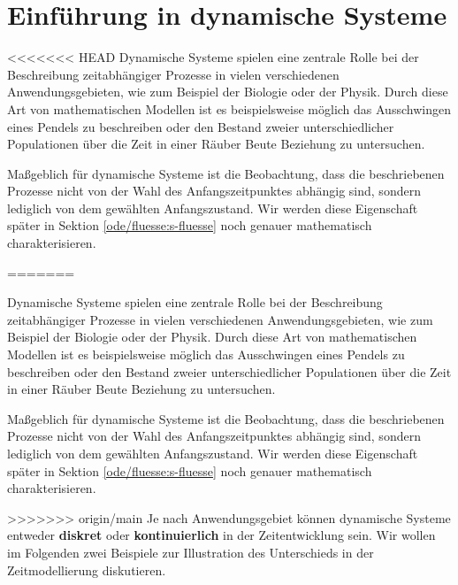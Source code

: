 \documentclass[letterpaper,10pt,english]{jupyterBook}
\begin{document}
\section{Einführung in dynamische Systeme}
\label{\detokenize{ode/dynamicSystems:einfuhrung-in-dynamische-systeme}}\label{\detokenize{ode/dynamicSystems::doc}}
<<<<<<< HEAD
Dynamische Systeme spielen eine zentrale Rolle bei der Beschreibung zeitabhängiger Prozesse in vielen verschiedenen Anwendungsgebieten, wie zum Beispiel der Biologie oder der Physik.
Durch diese Art von mathematischen Modellen ist es beispielsweise möglich das Ausschwingen eines Pendels zu beschreiben oder den Bestand zweier unterschiedlicher Populationen über die Zeit in einer Räuber Beute Beziehung zu untersuchen.

Maßgeblich für dynamische Systeme ist die Beobachtung, dass die beschriebenen Prozesse nicht von der Wahl des Anfangszeitpunktes abhängig sind, sondern lediglich von dem gewählten Anfangszustand.
Wir werden diese Eigenschaft später in Sektion \cref{ode/fluesse:s-fluesse}  noch genauer mathematisch charakterisieren.

=======
\par
Dynamische Systeme spielen eine zentrale Rolle bei der Beschreibung zeitabhängiger Prozesse in vielen verschiedenen Anwendungsgebieten, wie zum Beispiel der Biologie oder der Physik.
Durch diese Art von mathematischen Modellen ist es beispielsweise möglich das Ausschwingen eines Pendels zu beschreiben oder den Bestand zweier unterschiedlicher Populationen über die Zeit in einer Räuber Beute Beziehung zu untersuchen.

\par
Maßgeblich für dynamische Systeme ist die Beobachtung, dass die beschriebenen Prozesse nicht von der Wahl des Anfangszeitpunktes abhängig sind, sondern lediglich von dem gewählten Anfangszustand.
Wir werden diese Eigenschaft später in Sektion \cref{ode/fluesse:s-fluesse}  noch genauer mathematisch charakterisieren.

\par
>>>>>>> origin/main
Je nach Anwendungsgebiet können dynamische Systeme entweder \textbf{diskret} oder \textbf{kontinuierlich} in der Zeitentwicklung sein.
Wir wollen im Folgenden zwei Beispiele zur Illustration des Unterschieds in der Zeitmodellierung diskutieren.
\end{document}

